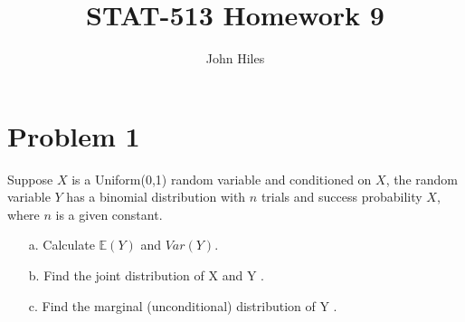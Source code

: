 \documentclass{article}
\title{STAT-513 Homework 9}
\author{John Hiles}
\begin{document}
\maketitle %


\section*{Problem 1}
Suppose $X$ is a Uniform(0,1) random variable and conditioned on $X$, the random
variable $Y$ has a binomial distribution with $n$ trials and success probability $X$, where $n$ is a given
constant.
\begin{enumerate}
\item[a.]
Calculate $\mathbb{E}(Y)$ and $Var(Y)$.
\item[b.]
Find the joint distribution of X and Y .
\item[c.]
Find the marginal (unconditional) distribution of Y .
\end{enumerate}
\end{document}
